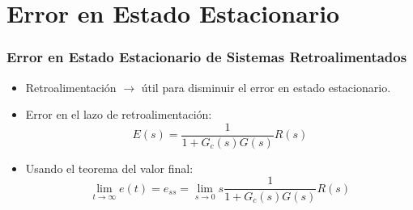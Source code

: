\documentclass[aspectratio=169,handout]{beamer}
\theoremstyle{definition}
\theoremstyle{plain}
\theoremstyle{remark}
\begin{document}
\section{Error en Estado Estacionario}
\begin{frame}[<+->]\frametitle{Error en Estado Estacionario de Sistemas Retroalimentados}
\begin{itemize}
	\item Retroalimentación $\rightarrow$ útil para disminuir el error en estado estacionario.
	\item Error en el lazo de retroalimentación:
	\begin{equation*}
		E(s) = \frac{1}{1+G_c(s)G(s)} R(s)
	\end{equation*}
	\item Usando el teorema del valor final:
	\begin{equation*}
		\lim_{t \rightarrow \infty} e(t) = e_{ss} = \lim_{s \rightarrow 0} s \frac{1}{1+G_c(s)G(s)}R(s)
	\end{equation*}
\end{itemize}
\end{frame}
\end{document}
